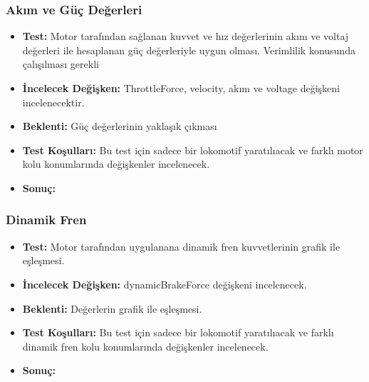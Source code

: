 \documentclass[10pt,a4paper]{article}
\begin{document}
\subsubsection{Akım ve Güç Değerleri}
\begin{itemize}
\item \textbf{Test:} Motor tarafından sağlanan kuvvet ve hız değerlerinin akım ve voltaj değerleri ile hesaplanan güç değerleriyle uygun olması. Verimlilik konusunda çalışılması gerekli\\
\item \textbf{İncelecek Değişken:} ThrottleForce, velocity, akım ve voltage değişkeni incelenecektir.\\
\item \textbf{Beklenti:} Güç değerlerinin yaklaşık çıkması\\
\item \textbf{Test Koşulları:} Bu test için sadece bir lokomotif yaratılıacak ve farklı motor kolu konumlarında değişkenler incelenecek.\\
\item \textbf{Sonuç:}
\end{itemize}

\subsubsection{Dinamik Fren}
\begin{itemize}
\item \textbf{Test:} Motor tarafından uygulanana dinamik fren kuvvetlerinin grafik ile eşleşmesi.\\
\item \textbf{İncelecek Değişken:} dynamicBrakeForce değişkeni incelenecek.\\
\item \textbf{Beklenti:} Değerlerin grafik ile eşleşmesi.\\
\item \textbf{Test Koşulları:} Bu test için sadece bir lokomotif yaratılıacak ve farklı dinamik fren kolu konumlarında değişkenler incelenecek.\\
\item \textbf{Sonuç:}
\end{itemize}
\end{document}
